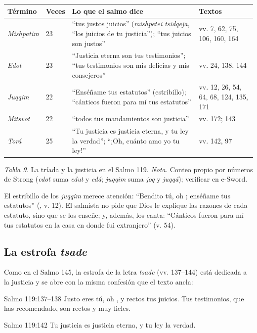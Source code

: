 \begin{center}\small\renewcommand{\arraystretch}{1.22}
\begin{tabular}{@{}L{2.3cm}L{1.2cm}L{6.6cm}L{4.2cm}@{}}
\toprule
\textbf{Término} & \textbf{Veces} & \textbf{Lo que el salmo dice} & \textbf{Textos} \\ \midrule
\emph{Mishpatim} & 23 & ``tus justos juicios'' (\emph{mishpetei tsidqeja}, ``los juicios de tu justicia''); ``tus juicios son justos'' & vv. 7, 62, 75, 106, 160, 164 \\
\emph{Edot} & 23 & ``Justicia eterna son tus testimonios''; ``tus testimonios son mis delicias y mis consejeros'' & vv. 24, 138, 144 \\
\emph{Juqqim} & 22 & ``Enséñame tus estatutos'' (estribillo); ``cánticos fueron para mí tus estatutos'' & vv. 12, 26, 54, 64, 68, 124, 135, 171 \\
\emph{Mitsvot} & 22 & ``todos tus mandamientos son justicia'' & vv. 172; 143 \\
\emph{Torá} & 25 & ``Tu justicia es justicia eterna, y tu ley la verdad''; ``¡Oh, cuánto amo yo tu ley!'' & vv. 142, 97 \\
\bottomrule
\end{tabular}\par
{\footnotesize\color{gris}\textit{Tabla 9.} La tríada y la justicia en el Salmo 119. \textit{Nota.} Conteo propio por números de Strong (\emph{edot} suma \emph{edut} y \emph{edá}; \emph{juqqim} suma \emph{joq} y \emph{juqqá}); verificar en e-Sword.}
\end{center}

El estribillo de los \emph{juqqim} merece atención: ``Bendito tú, oh \SENOR; enséñame tus estatutos'' (, v. 12). El salmista no pide que Dios le explique las razones de cada estatuto, sino que se los enseñe; y, además, los canta: ``Cánticos fueron para mí tus estatutos en la casa en donde fui extranjero'' (v. 54).

\subsection{La estrofa \emph{tsade}}
Como en el Salmo 145, la estrofa de la letra  \emph{tsade} (vv. 137--144) está dedicada a la justicia y se abre con la misma confesión que el texto ancla:

\begin{verso}{Salmo 119:137–138}
Justo eres tú, oh \SENOR, y rectos tus juicios. Tus testimonios, que has recomendado, son rectos y muy fieles.
\end{verso}
\begin{verso}{Salmo 119:142}
Tu justicia es justicia eterna, y tu ley la verdad.
\end{verso}

